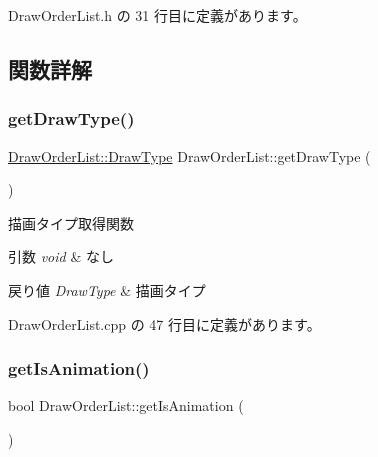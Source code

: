  Draw\+Order\+List.\+h の 31 行目に定義があります。



\subsection{関数詳解}
\mbox{\label{class_draw_order_list_a88af7401a2ecb32be3fcf5408946cd29}} 
\subsubsection{\texorpdfstring{get\+Draw\+Type()}{getDrawType()}}
{\footnotesize\ttfamily \mbox{\hyperlink{class_draw_order_list_a6c9b9ceb312c16d399ef355f4f3486bb}{Draw\+Order\+List\+::\+Draw\+Type}} Draw\+Order\+List\+::get\+Draw\+Type (\begin{DoxyParamCaption}{ }\end{DoxyParamCaption})}



描画タイプ取得関数 


\begin{DoxyParams}{引数}
{\em void} & なし \\
\hline
\end{DoxyParams}

\begin{DoxyRetVals}{戻り値}
{\em Draw\+Type} & 描画タイプ \\
\hline
\end{DoxyRetVals}


 Draw\+Order\+List.\+cpp の 47 行目に定義があります。

\mbox{\label{class_draw_order_list_a7131fc4155b8a35108697ad9628f337f}} 
\subsubsection{\texorpdfstring{get\+Is\+Animation()}{getIsAnimation()}}
{\footnotesize\ttfamily bool Draw\+Order\+List\+::get\+Is\+Animation (\begin{DoxyParamCaption}{ }\end{DoxyParamCaption})}




